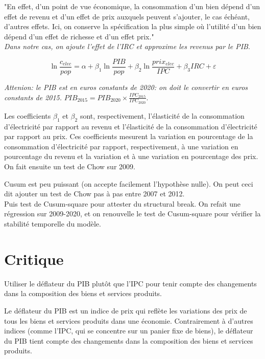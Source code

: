 "En effet, d’un point de vue économique, la consommation d’un bien dépend d’un effet de revenu et d’un effet de prix auxquels peuvent s’ajouter, le cas échéant, d’autres effets. Ici, on conserve la spécification la plus
simple où l’utilité d’un bien dépend d’un effet de richesse et d’un effet prix." \\

\textit{Dans notre cas, on ajoute l'effet de l'IRC et approxime les revenus par le PIB}.

\begin{equation}
    \ln{\frac{c_{elec}}{pop}} = \alpha + \beta_1 \ln{\frac{{PIB}}{pop}} + \beta_2 \ln{\frac{prix_{elec}}{IPC}} + \beta_3 IRC + \varepsilon
\end{equation}

\textit{Attenion: le PIB est en euros constants de 2020: on doit le convertir en euros constants de 2015.} 
$PIB_{2015} = PIB_{2020} \times \frac{IPC_{2015}}{IPC_{2020}}$.

Les coefficients $\beta_1$ et $\beta_2$ sont, respectivement, l’élasticité de la consommation
d’électricité par rapport au revenu et l’élasticité de la consommation d’électricité par rapport au prix. Ces coefficients mesurent la variation en pourcentage de la
consommation d’électricité par rapport, respectivement, à une variation en pourcentage du revenu et la variation et à une variation en pourcentage des prix. \\

On fait ensuite un test de Chow sur 2009.

Cusum est peu puissant (on accepte facilement l’hypothèse nulle). On peut ceci dit ajouter un test de Chow pas à pas entre 2007 et 2012. \\

Puis test de Cusum-square pour attester du structural break. On refait une régression sur 2009-2020, et on renouvelle le test de Cusum-square pour vérifier la stabilité temporelle du modèle. 



\section{Critique}
Utiliser le déflateur du PIB plutôt que l'IPC pour tenir compte des changements dans la composition des biens et services produits. 

Le déflateur du PIB est un indice de prix qui reflète les variations des prix de tous les biens et services produits dans une économie. Contrairement à d’autres indices (comme l’IPC, qui se concentre sur un panier fixe de biens), le déflateur du PIB tient compte des changements dans la composition des biens et services produits.